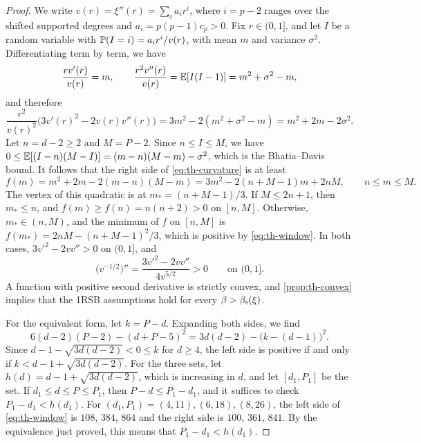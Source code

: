 \begin{proof}
We write $v(r)=\xi''(r)=\sum_ia_ir^i$, where $i=p-2$ ranges over the shifted supported degrees and $a_i=p(p-1)c_p>0$. Fix $r\in(0,1]$, and let $I$ be a random variable with $\mathbb P(I=i)=a_ir^i/v(r)$, with mean $m$ and variance $\sigma^2$. Differentiating term by term, we have
\[
\frac{rv'(r)}{v(r)}=m,\qquad\frac{r^2v''(r)}{v(r)}=\mathbb E[I(I-1)]=m^2+\sigma^2-m,
\]
and therefore
\begin{equation}\label{eq:th-curvature}
\frac{r^2}{v(r)^2}\big(3v'(r)^2-2v(r)v''(r)\big)=3m^2-2(m^2+\sigma^2-m)=m^2+2m-2\sigma^2.
\end{equation}
Let $n=d-2\ge2$ and $M=P-2$. Since $n\le I\le M$, we have $0\le\mathbb E[(I-n)(M-I)]=(m-n)(M-m)-\sigma^2$, which is the Bhatia--Davis bound. It follows that the right side of \eqref{eq:th-curvature} is at least
\[
f(m)=m^2+2m-2(m-n)(M-m)=3m^2-2(n+M-1)m+2nM,\qquad n\le m\le M.
\]
The vertex of this quadratic is at $m_*=(n+M-1)/3$. If $M\le2n+1$, then $m_*\le n$, and $f(m)\ge f(n)=n(n+2)>0$ on $[n,M]$. Otherwise, $m_*\in(n,M)$, and the minimum of $f$ on $[n,M]$ is $f(m_*)=2nM-(n+M-1)^2/3$, which is positive by \eqref{eq:th-window}. In both cases, $3v'^2-2vv''>0$ on $(0,1]$, and
\[
\big(v^{-1/2}\big)''=\frac{3v'^2-2vv''}{4v^{5/2}}>0\qquad\text{on }(0,1].
\]
A function with positive second derivative is strictly convex, and \cref{prop:th-convex} implies that the 1RSB assumptions hold for every $\beta>\beta_{\mathrm s}(\xi)$.

For the equivalent form, let $k=P-d$. Expanding both sides, we find
\[
6(d-2)(P-2)-(d+P-5)^2=3d(d-2)-\big(k-(d-1)\big)^2.
\]
Since $d-1-\sqrt{3d(d-2)}<0\le k$ for $d\ge4$, the left side is positive if and only if $k<d-1+\sqrt{3d(d-2)}$. For the three sets, let $h(d)=d-1+\sqrt{3d(d-2)}$, which is increasing in $d$, and let $[d_1,P_1]$ be the set. If $d_1\le d\le P\le P_1$, then $P-d\le P_1-d_1$, and it suffices to check $P_1-d_1<h(d_1)$. For $(d_1,P_1)=(4,11),(6,18),(8,26)$, the left side of \eqref{eq:th-window} is $108$, $384$, $864$ and the right side is $100$, $361$, $841$. By the equivalence just proved, this means that $P_1-d_1<h(d_1)$.
\end{proof}

